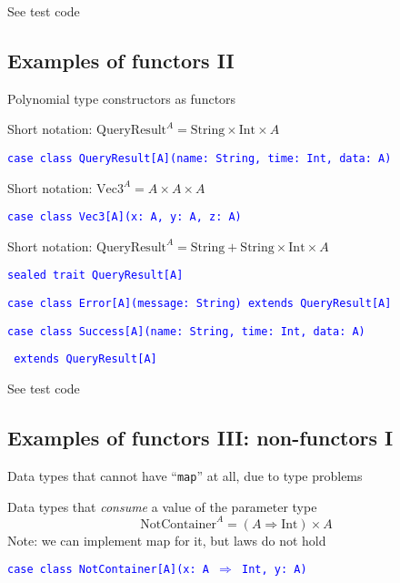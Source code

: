 See test code


\subsection{Examples of functors II}

Polynomial type constructors as functors

Short notation: $\text{QueryResult}^{A}=\text{String}\times\text{Int}\times A$

\texttt{\textcolor{blue}{\footnotesize{}case class QueryResult{[}A{]}(name: String,
time: Int, data: A)}}{\footnotesize\par}

Short notation: $\text{Vec3}^{A}=A\times A\times A$

\texttt{\textcolor{blue}{\footnotesize{}case class Vec3{[}A{]}(x: A,
y: A, z: A)}}{\footnotesize\par}

Short notation: $\text{QueryResult}^{A}=\text{String}+\text{String}\times\text{Int}\times A$

\texttt{\textcolor{blue}{\footnotesize{}sealed trait QueryResult{[}A{]}}}{\footnotesize\par}

\texttt{\textcolor{blue}{\footnotesize{}case class Error{[}A{]}(message: String)
extends QueryResult{[}A{]}}}{\footnotesize\par}

\texttt{\textcolor{blue}{\footnotesize{}case class Success{[}A{]}(name: String,
time: Int, data: A) }}{\footnotesize\par}

\texttt{\textcolor{blue}{\footnotesize{}                     extends
QueryResult{[}A{]}}}{\footnotesize\par}

See test code


\subsection{Examples of functors III: non-functors I}

Data types that cannot have ``\texttt{map}'' at all, due to type
problems

Data types that \emph{consume} a value of the parameter type
\[
\text{NotContainer}^{A}=\left(A\Rightarrow\text{Int}\right)\times A
\]
Note: we can implement map for it, but laws do not hold

\texttt{\textcolor{blue}{\footnotesize{}case class NotContainer{[}A{]}(x: A
$\Rightarrow$ Int, y: A)}}{\footnotesize\par}

